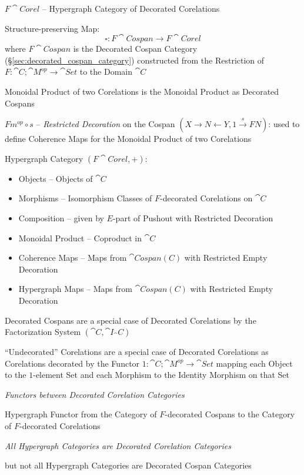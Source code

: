 \asterism


$F\cat{Corel}$ -- Hypergraph Category of Decorated Corelations

Structure-preserving Map:
\[
  \square : F\cat{Cospan} \rightarrow F\cat{Corel}
\]
where $F\cat{Cospan}$ is the Decorated Cospan Category
(\S\ref{sec:decorated_cospan_category}) constructed from the
Restriction of $F : \cat{C};\cat{M}^{op} \rightarrow \cat{Set}$ to the
Domain $\cat{C}$

Monoidal Product of two Corelations is the Monoidal Product as
Decorated Cospans

$F m^{op} \circ s$ -- \emph{Restricted Decoration} on the Cospan $(X
\rightarrow N \leftarrow Y, 1 \xrightarrow{s} F N)$: used to define
Coherence Maps for the Monoidal Product of two Corelations

Hypergraph Category $(F\cat{Corel}, +)$:
\begin{itemize}
  \item Objects -- Objects of $\cat{C}$
  \item Morphisms -- Isomorphism Classes of $F$-decorated Corelations
    on $\cat{C}$
  \item Composition -- given by $E$-part of Pushout with Restricted
    Decoration %
  \item Monoidal Product -- Coproduct in $\cat{C}$
  \item Coherence Maps -- Maps from $\cat{Cospan(C)}$ with Restricted
    Empty Decoration
  \item Hypergraph Maps -- Maps from $\cat{Cospan(C)}$ with Restricted
    Empty Decoration
\end{itemize}

Decorated Cospans are a special case of Decorated Corelations by the
Factorization System $(\cat{C},\cat{I}_\cat{C})$ %

``Undecorated'' Corelations are a special case of Decorated
Corelations as Corelations decorated by the Functor $1 :
\cat{C};\cat{M}^{op} \rightarrow \cat{Set}$ mapping each Object to the
$1$-element Set and each Morphism to the Identity Morphism on that Set


\emph{Functors between Decorated Corelation Categories} %

Hypergraph Functor from the Category of $F$-decorated Cospans to the
Category of $F$-decorated Corelations


\emph{All Hypergraph Categories are Decorated Corelation Categories}

but not all Hypergraph Categories are Decorated Cospan Categories



